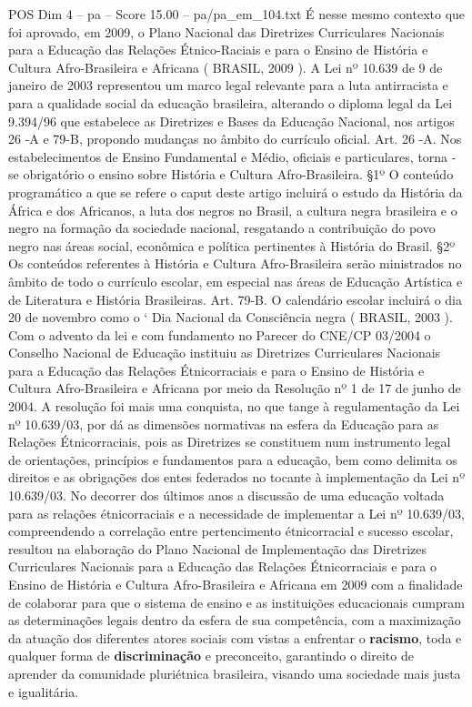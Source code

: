 \begin{textsample}{POS Dim 4 – pa – Score 15.00 – pa/pa\_em\_104.txt}
É nesse mesmo contexto que foi aprovado, em 2009, o Plano Nacional das Diretrizes Curriculares Nacionais para a Educação das Relações Étnico-Raciais e para o Ensino de História e Cultura Afro-Brasileira e Africana ( BRASIL, 2009 ).
A Lei nº 10.639 de 9 de janeiro de 2003 representou um marco legal relevante para a luta antirracista e para a qualidade social da educação brasileira, alterando o diploma legal da Lei 9.394/96 que estabelece as Diretrizes e Bases da Educação Nacional, nos artigos 26 -A e 79-B, propondo mudanças no âmbito do currículo oficial.
Art. 26 -A.
Nos estabelecimentos de Ensino Fundamental e Médio, oficiais e particulares, torna -se obrigatório o ensino sobre História e Cultura Afro-Brasileira. §1º O conteúdo programático a que se refere o caput deste artigo incluirá o estudo da História da África e dos Africanos, a luta dos negros no Brasil, a cultura negra brasileira e o negro na formação da sociedade nacional, resgatando a contribuição do povo negro nas áreas social, econômica e política pertinentes à História do Brasil. §2º Os conteúdos referentes à História e Cultura Afro-Brasileira serão ministrados no âmbito de todo o currículo escolar, em especial nas áreas de Educação Artística e de Literatura e História Brasileiras.
Art. 79-B.
O calendário escolar incluirá o dia 20 de novembro como o ‘ Dia Nacional da Consciência negra ( BRASIL, 2003 ).
Com o advento da lei e com fundamento no Parecer do CNE/CP 03/2004 o Conselho Nacional de Educação instituiu as Diretrizes Curriculares Nacionais para a Educação das Relações Étnicorraciais e para o Ensino de História e Cultura Afro-Brasileira e Africana por meio da Resolução nº 1 de 17 de junho de 2004.
A resolução foi mais uma conquista, no que tange à regulamentação da Lei nº 10.639/03, por dá as dimensões normativas na esfera da Educação para as Relações Étnicorraciais, pois as Diretrizes se constituem num instrumento legal de orientações, princípios e fundamentos para a educação, bem como delimita os direitos e as obrigações dos entes federados no tocante à implementação da Lei nº 10.639/03.
No decorrer dos últimos anos a discussão de uma educação voltada para as relações étnicorraciais e a necessidade de implementar a Lei nº 10.639/03, compreendendo a correlação entre pertencimento étnicorracial e sucesso escolar, resultou na elaboração do Plano Nacional de Implementação das Diretrizes Curriculares Nacionais para a Educação das Relações Étnicorraciais e para o Ensino de História e Cultura Afro-Brasileira e Africana em 2009 com a finalidade de colaborar para que o sistema de ensino e as instituições educacionais cumpram as determinações legais dentro da esfera de sua competência, com a maximização da atuação dos diferentes atores sociais com vistas a enfrentar o \textbf{racismo}, toda e qualquer forma de \textbf{discriminação} e preconceito, garantindo o direito de aprender da comunidade pluriétnica brasileira, visando uma sociedade mais justa e igualitária.

\end{textsample}
